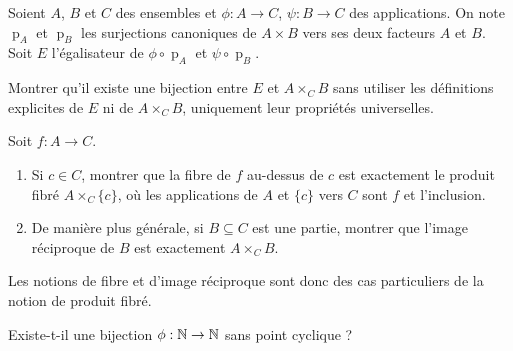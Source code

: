 \begin{exercice}
Soient $A$, $B$ et $C$ des ensembles et $\phi : A\to C$, $\psi : B\to C$ des applications. On note $\operatorname{p}_A$ et $\operatorname{p}_B$ les surjections canoniques de $A\times B$ vers ses deux facteurs $A$ et $B$. Soit $E$ l'égalisateur de $\phi \circ \operatorname{p}_A$ et $\psi \circ \operatorname{p}_B$.

Montrer qu'il existe une bijection entre $E$ et $A\times_C B$ sans utiliser les définitions explicites de $E$ ni de $A\times_C B$, uniquement leur propriétés universelles.
\end{exercice}

\begin{exercice}
Soit $f : A\to C$.
\begin{enumerate}
\item Si $c\in C$, montrer que la fibre de $f$ au-dessus de $c$ est exactement le produit fibré $A\times_C \{c\}$, où les applications de $A$ et $\{c\}$ vers $C$ sont $f$ et l'inclusion.
\item De manière plus générale, si $B\subseteq C$ est une partie, montrer que l'image réciproque de $B$ est exactement $A\times_C B$.
\end{enumerate}
Les notions de fibre et d'image réciproque sont donc des cas particuliers de la notion de produit fibré.
\end{exercice}

\begin{exercice}
Existe-t-il une bijection $\phi : \mathbb{N}\to \mathbb{N}$ sans point cyclique ? %
\end{exercice}




